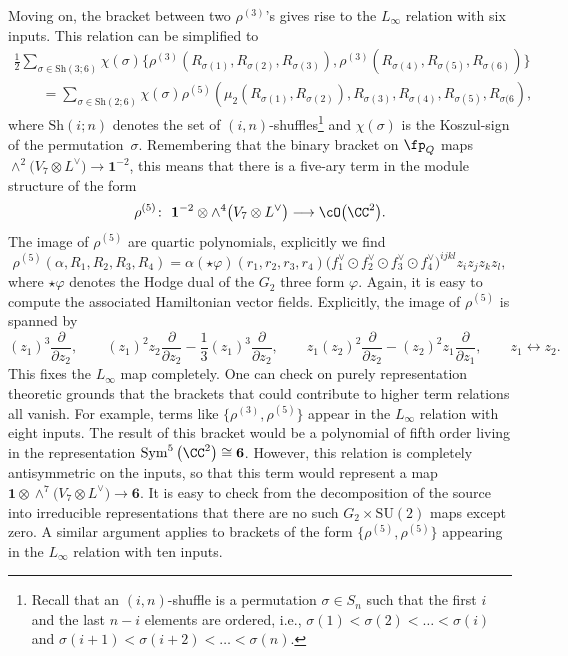 \documentclass[pdftex]{sigma}
\numberwithin{equation}{section}
\theoremstyle{definition}
\DeclareMathOperator{\Sym}{Sym}
\def\SU{\ensuremath{\mathrm{SU}}}
\begin{document}
Moving on, the bracket between two $\rho^{(3)}$'s gives rise to the $L_\infty$ relation with six inputs. This relation can be simplified to
\begin{gather*}
 \frac{1}{2} \sum_{\sigma \in \mathrm{Sh}(3;6)} \chi(\sigma) \big\{ \rho^{(3)}(R_{\sigma(1)},R_{\sigma(2)},R_{\sigma(3)}) , \rho^{(3)} (R_{\sigma(4)},R_{\sigma(5)},R_{\sigma(6)}) \big\} \\
\qquad = \sum_{\sigma \in \mathrm{Sh}(2;6)} \chi(\sigma) \rho^{(5)}( \mu_2(R_{\sigma(1)},R_{\sigma(2)}),R_{\sigma(3)},R_{\sigma(4)},R_{\sigma(5)} , R_{\sigma(6} ),
\end{gather*}
where $\mathrm{Sh}(i;n)$ denotes the set of $(i,n)$-shuffles\footnote{Recall that an $(i,n)$-shuffle is a permutation $\sigma \in S_n$ such that the first $i$ and the last $n-i$ elements are ordered, i.e., $\sigma(1) < \sigma(2) < \dots< \sigma(i)$ and $\sigma(i+1) < \sigma(i+2) < \dots < \sigma(n)$.} and $\chi(\sigma)$ is the Koszul-sign of the permutation~$\sigma$.
Remembering that the binary bracket on $\fp_Q$ maps $\wedge^2 \big(V_7 \otimes L^\vee\big) \rightarrow \textbf{1}^{-2}$, this means that there is a five-ary term in the module structure of the form
\[
 \rho^{(5)} \colon\ \textbf{1}^{-2} \otimes \wedge^4 \big(V_7 \otimes L^\vee\big) \longrightarrow \cO\big(\CC^2\big).
\]
The image of $\rho^{(5)}$ are quartic polynomials, explicitly we find
\[
 \rho^{(5)}(\alpha, R_1, R_2, R_3 , R_4) = \alpha (\star \varphi)(r_1,r_2,r_3,r_4) \big(f_1^\vee \odot f_2^\vee \odot f_3^\vee \odot f_4^\vee\big)^{ijkl} z_i z_j z_k z_l,
\]
where $\star \varphi$ denotes the Hodge dual of the $G_2$ three form $\varphi$. Again, it is easy to compute the associated Hamiltonian vector fields. Explicitly, the image of $\rho^{(5)}$ is spanned by
\[
 (z_1)^3 \frac{\partial}{\partial z_2}, \qquad (z_1)^2 z_2 \frac{\partial}{\partial z_2} - \frac{1}{3} (z_1)^3 \frac{\partial}{\partial z_2}, \qquad z_1 (z_2)^2 \frac{\partial}{\partial z_2} - (z_2)^2 z_1 \frac{\partial}{\partial z_1}, \qquad z_1 \leftrightarrow z_2.
\]
This fixes the $L_\infty$ map completely. One can check on purely representation theoretic grounds that the brackets that could contribute to higher term relations all vanish. For example, terms like $\big\{\rho^{(3)} , \rho^{(5)} \big\}$ appear in the $L_\infty$ relation with eight inputs. The result of this bracket would be a polynomial of fifth order living in the representation $\Sym^5\big(\CC^2\big) \cong \textbf{6}$. However, this relation is completely antisymmetric on the inputs, so that this term would represent a map $\textbf{1} \otimes \wedge^7 \big({V_7 \otimes L^\vee}\big) \rightarrow \textbf{6}$. It is easy to check from the decomposition of the source into irreducible representations that there are no such $G_2 \times \SU(2)$ maps except zero. A similar argument applies to brackets of the form $\big\{\rho^{(5)}, \rho^{(5)} \big\}$ appearing in the $L_\infty$ relation with ten inputs.
\end{document}
